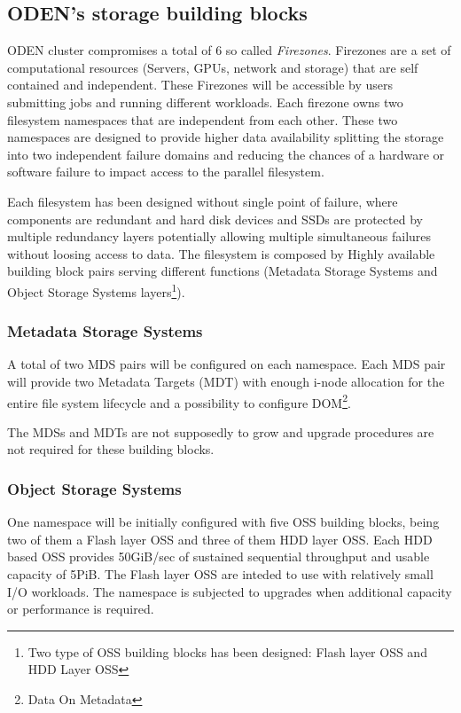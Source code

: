 \documentclass{article}
\begin{document}
\subsection{ODEN's storage building blocks}
ODEN cluster compromises a total of 6 so called \textit{Firezones}. Firezones are a set of computational resources (Servers, GPUs, network and storage) that are self contained and independent. These Firezones will be accessible by users submitting jobs and running different workloads. Each firezone owns two filesystem namespaces that are independent from each other. These two namespaces are designed to provide higher data availability splitting the storage into two independent failure domains and reducing the chances of a hardware or software failure to impact access to the parallel filesystem.

Each filesystem has been designed without single point of failure, where components are redundant and hard disk devices and SSDs are protected by multiple redundancy layers potentially allowing multiple simultaneous failures without loosing access to data. The filesystem is composed by Highly available building block pairs serving different functions (Metadata Storage Systems and Object Storage Systems layers\footnote{Two type of OSS building blocks has been designed: Flash layer OSS and HDD Layer OSS}).


\subsubsection{Metadata Storage Systems}
A total of two MDS pairs will be configured on each namespace. Each MDS pair will provide two Metadata Targets (MDT) with enough i-node allocation for the entire file system lifecycle and a possibility to configure DOM\footnote{Data On Metadata}. 

The MDSs and MDTs are not supposedly to grow and upgrade procedures are not required for these building blocks.

\subsubsection{Object Storage Systems}
One namespace will be initially configured with five OSS building blocks, being two of them a Flash layer OSS and three of them HDD layer OSS. Each HDD based OSS provides 50GiB/sec of sustained sequential throughput and usable capacity of 5PiB. The Flash layer OSS are inteded to use with relatively small I/O workloads. The namespace is subjected to upgrades when additional capacity or performance is required. 
\end{document}
